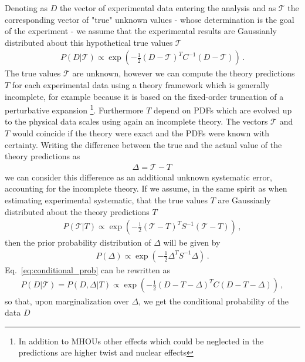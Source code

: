 %
Denoting as $D$ the vector of experimental data entering the analysis and as $\mathcal{T}$ the corresponding vector of 
"true" unknown values - whose determination is the goal of the experiment - we assume that the experimental results
are Gaussianly distributed about this hypothetical true values $\mathcal{T}$ 
\begin{align}
    \label{eq:conditional_prob}
    P\left(D|\mathcal{T}\right) \propto
    \exp\left(-\frac{1}{2}\left(D-\mathcal{T}\right)^T C^{-1} \left(D-\mathcal{T}\right)\right)\,.
\end{align}
The true values $\mathcal{T}$ are unknown, however we can compute the theory predictions $T$ 
for each experimental data using a theory framework which is 
generally incomplete, for example because it is based on the fixed-order truncation of a perturbative
expansion \footnote{In addition to MHOUs other effects which could be neglected in the predictions are 
higher twist and nuclear effects}. Furthermore $T$ depend on PDFs which are evolved up to 
the physical data scales using again an incomplete theory. The vectors $\mathcal{T}$ and $T$ would coincide
if the theory were exact and the PDFs were known with certainty.
%
Writing the difference between the true and the actual value of the theory predictions as
\begin{align}
    \Delta = \mathcal{T} - T\,
\end{align}
we can consider this difference as an additional unknown systematic error, accounting for the incomplete theory.
If we assume, in the same spirit as when estimating experimental systematic, that the true values $T$ are 
Gaussianly distributed about the theory predictions $T$
\begin{align}
    \label{eq:gaussian_hyp}
    P\left(\mathcal{T}|T\right) \propto 
    \exp\left(-\frac{1}{2}\left(\mathcal{T}-T\right)^T S^{-1} \left(\mathcal{T}-T\right)\right)\,,
\end{align}
then the prior probability distribution of $\Delta$ will be given by
\begin{align}
    P\left(\Delta\right) \propto \exp\left(-\frac{1}{2}\Delta^T S^{-1} \Delta\right)\,. 
\end{align}
Eq.~\ref{eq:conditional_prob} can be rewritten as
\begin{align}
    P\left(D|\mathcal{T}\right) = P\left(D, \Delta|T\right)  \propto 
    \exp\left(-\frac{1}{2}\left(D - T - \Delta\right)^T C \left(D-T-\Delta\right)\right)\,,   
\end{align}
so that, upon marginalization over $\Delta$, we get the conditional probability of the data $D$ 
